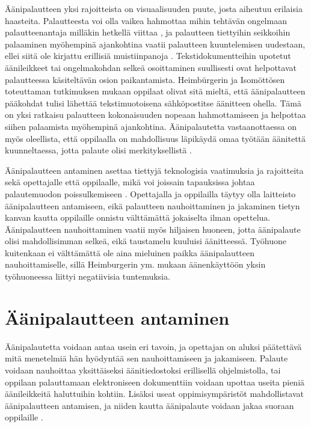 \documentclass[utf8]{gradu3}
\begin{document}
Äänipalautteen yksi rajoitteista on visuaalisuuden puute, josta aiheutuu erilaisia haasteita. Palautteesta voi olla vaikea hahmottaa mihin tehtävän ongelmaan palautteenantaja milläkin hetkellä viittaa \parencite[][]{versus}, ja palautteen tiettyihin seikkoihin palaaminen myöhempinä ajankohtina vaatii palautteen kuuntelemisen uudestaan, ellei siitä ole kirjattu erillisiä muistiinpanoja \parencite[][]{evaluating}. Tekstidokumentteihin upotetut äänileikkeet tai ongelmakohdan selkeä osoittaminen suullisesti ovat helpottavat palautteessa käsiteltävän osion paikantamista. Heimbürgerin ja Isomöttösen \parencite[][]{moderating} toteuttaman tutkimuksen mukaan oppilaat olivat sitä mieltä, että äänipalautteen pääkohdat tulisi lähettää tekstimuotoisena sähköpostitse äänitteen ohella. Tämä on yksi ratkaisu palautteen kokonaisuuden nopeaan hahmottamiseen ja helpottaa siihen palaamista myöhempinä ajankohtina. Äänipalautetta vastaanottaessa on myös oleellista, että oppilaalla on mahdollisuus läpikäydä omaa työtään äänitettä kuunneltaessa, jotta palaute olisi merkityksellistä \parencite[][]{usingAudio}.

Äänipalautteen antaminen asettaa tiettyjä teknologisia vaatimuksia ja rajoitteita sekä opettajalle että oppilaalle, mikä voi joissain tapauksissa johtaa palautemuodon poissulkemiseen \parencite[][]{developing}. Opettajalla ja oppilailla täytyy olla laitteisto äänipalautteen antamiseen, eikä palautteen nauhoittaminen ja jakaminen tietyn kanvan kautta oppilaille onnistu välttämättä jokaiselta ilman opettelua. Äänipalautteen nauhoittaminen vaatii myös hiljaisen huoneen, jotta äänipalaute olisi mahdollisimman selkeä, eikä taustamelu kuuluisi äänitteessä. Työhuone kuitenkaan ei välttämättä ole aina mieluinen paikka äänipalautteen nauhoittamiselle, sillä Heimburgerin ym. \parencite[][]{academics} mukaan äänenkäyttöön yksin työhuoneessa liittyi negatiivisia tuntemuksia.

\section{Äänipalautteen antaminen}

Äänipalautetta voidaan antaa usein eri tavoin, ja opettajan on aluksi päätettävä mitä menetelmiä hän hyödyntää sen nauhoittamiseen ja jakamiseen. Palaute voidaan nauhoittaa yksittäiseksi äänitiedostoksi erillisellä ohjelmistolla, tai oppilaan palauttamaan elektroniseen dokumenttiin voidaan upottaa useita pieniä äänileikkeitä haluttuihin kohtiin. Lisäksi useat oppimisympäristöt mahdollistavat äänipalautteen antamisen, ja niiden kautta äänipalaute voidaan jakaa suoraan oppilaille \parencite[][]{using}. 
\end{document}
